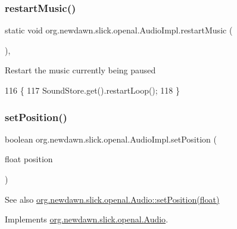 \subsubsection{\texorpdfstring{restart\+Music()}{restartMusic()}}
{\footnotesize\ttfamily static void org.\+newdawn.\+slick.\+openal.\+Audio\+Impl.\+restart\+Music (\begin{DoxyParamCaption}{ }\end{DoxyParamCaption})\hspace{0.3cm}{\ttfamily [inline]}, {\ttfamily [static]}}

Restart the music currently being paused 
\begin{DoxyCode}
116                                       \{
117         SoundStore.get().restartLoop();
118     \}
\end{DoxyCode}
\mbox{\label{classorg_1_1newdawn_1_1slick_1_1openal_1_1_audio_impl_a9291d2e2d534fdfbd6a50e4948de954f}} 
\subsubsection{\texorpdfstring{set\+Position()}{setPosition()}}
{\footnotesize\ttfamily boolean org.\+newdawn.\+slick.\+openal.\+Audio\+Impl.\+set\+Position (\begin{DoxyParamCaption}\item[{float}]{position }\end{DoxyParamCaption})\hspace{0.3cm}{\ttfamily [inline]}}

\begin{DoxySeeAlso}{See also}
\mbox{\hyperlink{interfaceorg_1_1newdawn_1_1slick_1_1openal_1_1_audio_ace6e2e6fd29f40a8fe5daf8b28bc75e7}{org.\+newdawn.\+slick.\+openal.\+Audio\+::set\+Position(float)}} 
\end{DoxySeeAlso}


Implements \mbox{\hyperlink{interfaceorg_1_1newdawn_1_1slick_1_1openal_1_1_audio_ace6e2e6fd29f40a8fe5daf8b28bc75e7}{org.\+newdawn.\+slick.\+openal.\+Audio}}.


